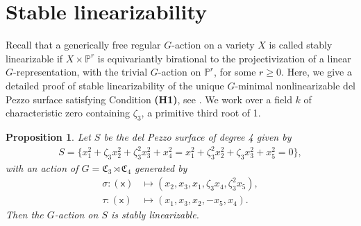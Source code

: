 \documentclass[12pt, reqno]{amsart}
\theoremstyle{plain}
\newtheorem{prop}{Proposition}[section]
\theoremstyle{remark}
\theoremstyle{definition}
\numberwithin{equation}{section}
\def\fC{{\mathfrak C}}
\def\bP{{\mathbb P}}
\begin{document}
\section{Stable linearizability}
\label{sect:C3C4}

Recall that a generically free regular $G$-action on a variety $X$ is called stably linearizable if $X\times\bP^r$ is equivariantly birational to the projectivization of a linear $G$-representation, with the trivial $G$-action on $\bP^r$, for some $r\geq 0$. Here, we give a detailed proof of stable linearizability of the unique 
$G$-minimal nonlinearizable del Pezzo surface satisfying Condition {\bf(H1)}, see \cite[Theorem 1.2]{Pro-2}.  We work over a field $k$ of characteristic zero containing $\zeta_3$, a primitive third root of 1. 

\begin{prop}
\label{prop:c3c4}
    Let $S$ be the del Pezzo surface of degree 4 given by 
    \begin{align*}
          S=\{x_1^2+\zeta_3x_2^2+\zeta_3^2x_3^2+x_4^2=x_1^2+\zeta_3^2x_2^2+\zeta_3x_3^2+x_5^2=0\},
    \end{align*}
    with an action of $G=\fC_3\rtimes\fC_4$ generated by 
    \begin{align*}
        \sigma:(\mathsf x)&\mapsto (x_2,x_3,x_1,\zeta_3x_4,\zeta_3^2x_5),\\
        \tau:(\mathsf x)&\mapsto (x_1,x_3,x_2,-x_5,x_4).
    \end{align*}
    Then the $G$-action on $S$ is stably linearizable. 
\end{prop}
\end{document}

